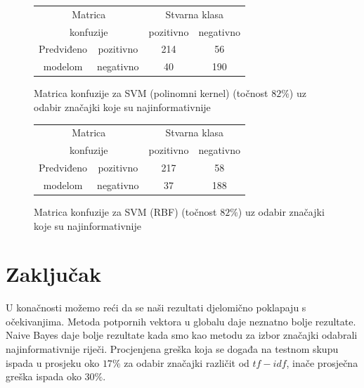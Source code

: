 \documentclass[conference]{IEEEtran}
\begin{document}
\begin{figure}[H]
\begin{minipage}{0.5\textwidth}
\centering
\begin{tabular}{|c|c|c|c|}
  \hline
  \multicolumn{2}{|c|}{Matrica}  & \multicolumn{2}{|c|}{Stvarna klasa} \\ 
  \cline{3-4}
  \multicolumn{2}{|c|}{konfuzije} & pozitivno & negativno \\ 
  \hline
  Predviđeno & pozitivno & 214 & 56 \\
  \cline{2-4}
  modelom & negativno & 40 & 190 \\
  \hline
\end{tabular}
\caption{Matrica konfuzije za SVM (polinomni kernel) (točnost $82\%$) uz odabir značajki koje su najinformativnije}
\end{minipage}
\end{figure}

\begin{figure}[H]
\begin{minipage}{0.5\textwidth}
\centering
\begin{tabular}{|c|c|c|c|}
  \hline
  \multicolumn{2}{|c|}{Matrica}  & \multicolumn{2}{|c|}{Stvarna klasa} \\ 
  \cline{3-4}
  \multicolumn{2}{|c|}{konfuzije} & pozitivno & negativno \\ 
  \hline
  Predviđeno & pozitivno & 217 & 58 \\
  \cline{2-4}
  modelom & negativno & 37 & 188 \\
  \hline
\end{tabular}
\caption{Matrica konfuzije za SVM (RBF) (točnost $82\%$) uz odabir značajki koje su najinformativnije}
\end{minipage}
\end{figure}

\section{Zaključak}

U konačnosti možemo reći da se naši rezultati djelomično poklapaju s
očekivanjima. Metoda potpornih vektora u globalu daje neznatno bolje rezultate.
Naive Bayes daje bolje rezultate kada smo kao metodu za izbor značajki odabrali
najinformativnije riječi. Procjenjena greška koja se događa na testnom skupu
ispada u prosjeku oko $17\%$ za odabir značajki različit od $tf-idf$, inače
prosječna greška ispada oko $30\%$.
\end{document}
